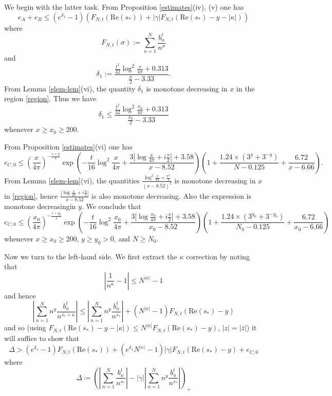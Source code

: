 We begin with the latter task.  From Proposition \ref{estimates}(iv), (v) one has
\begin{equation}\label{eab-bound}
 e_A + e_B \leq (e^{\delta_1}-1) (F_{N,t}(\mathrm{Re}(s_*)) + |\gamma| F_{N,t}( \mathrm{Re}(s_*) - y - |\kappa| ) )
\end{equation}
where
\begin{equation}\label{fnt-def}
 F_{N,t}( \sigma ) := \sum_{n=1}^N \frac{b_n^t}{n^\sigma}
\end{equation}
and
$$ \delta_1 := \frac{\frac{t^2}{32} \log^2 \frac{x}{4\pi} + 0.313}{\frac{x}{2}-3.33}.$$
From Lemma \ref{elem-lem}(vi), the quantity $\delta_1$ is monotone decreasing in $x$ in the region \eqref{region}.  Thus we have
\begin{equation}\label{delta1-bound}
 \delta_1 \leq \frac{\frac{t^2}{32} \log^2 \frac{x_0}{4\pi} + 0.313}{\frac{x_0}{2}-3.33}
\end{equation}
whenever $x \geq x_0 \geq 200$.

From Proposition \ref{estimates}(vi) one has
$$ e_{C,0} \leq \left(\frac{x}{4\pi}\right)^{-\frac{1+y}{4}} \exp\left( - \frac{t}{16} \log^2 \frac{x}{4\pi} + \frac{3 |\log \frac{x}{4\pi} + i \frac{\pi}{2}|+3.58}{x-8.52} \right) \left(1 + \frac{1.24 \times (3^y+3^{-y})}{N-0.125} + \frac{6.72}{x-6.66}\right).$$
From Lemma \ref{elem-lem}(vi), the quantities $\frac{\log^2 \frac{x}{4\pi} + \frac{\pi^2}{4}}{(x-8.52)^2}$ is monotone decreasing in $x$ in \eqref{region}, hence $\frac{|\log \frac{x}{4\pi} + i \frac{\pi}{2}|}{x-8.52}$ is also monotone decreasing.  Also the expression is monotone decreasingin $y$. We conclude that
\begin{equation}\label{ec-bound}
 e_{C,0} \leq \left(\frac{x_0}{4\pi}\right)^{-\frac{1+y_0}{4}} \exp\left( - \frac{t}{16} \log^2 \frac{x_0}{4\pi} + \frac{3 |\log \frac{x_0}{4\pi} + i \frac{\pi}{2}|+3.58}{x_0-8.52} \right) \left(1 + \frac{1.24 \times (3^{y_0}+3^{-y_0})}{N_0-0.125} + \frac{6.72}{x_0-6.66}\right)
\end{equation}
whenever $x \geq x_0 \geq 200$, $y \geq y_0 > 0$, and $N \geq N_0$.

Now we turn to the left-hand side.   We first extract the $\kappa$ correction by noting that
$$ \left| \frac{1}{n^\kappa} - 1\right| \leq N^{|\kappa|} - 1$$
and hence
$$ \left|\sum_{n=1}^N n^y \frac{b_n^t}{n^{\overline{s_*} + \kappa}}\right| \leq \left|\sum_{n=1}^N n^y \frac{b_n^t}{n^{\overline{s_*}}}\right| + (N^{|\kappa|}-1) F_{N,t}( \mathrm{Re}(s_*) - y )$$
and so (using $F_{N,t}( \mathrm{Re}(s_*) - y - |\kappa| ) \leq N^{|\kappa|} F_{N,t}( \mathrm{Re}(s_*) - y)$, $|z| = |\overline{z}|$) it will suffice to show that
$$
\Delta >
(e^{\delta_1}-1) F_{N,t}(\mathrm{Re}(s_*)) 
+ (e^{\delta_1} N^{|\kappa|} - 1) |\gamma| F_{N,t}( \mathrm{Re}(s_*) - y )
+ e_{C,0}$$
where
$$ \Delta \coloneqq \left( \left|\sum_{n=1}^N \frac{b_n^t}{n^{s_*}}\right| - |\gamma| \left|\sum_{n=1}^N n^y \frac{b_n^t}{n^{s_*}}\right|\right)_+$$

